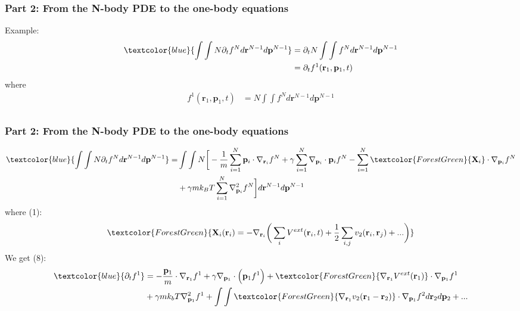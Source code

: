 \documentclass[aspectratio=169,xcolor=dvipsnames]{beamer}
\begin{document}
\begin{frame}
	\frametitle{Part 2: From the N-body PDE to the one-body equations}
	Example:
	\begin{align*}
	 \textcolor{blue}{\int \int N \partial_t f^N d \mathbf{r}^{N-1} d\mathbf{p}^{N-1}} &= \partial_t N \int \int   f^N d \mathbf{r}^{N-1} d\mathbf{p}^{N-1} \\
	 &=  \partial_t f^1(\mathbf{r}_1,\mathbf{p}_1,t)
	 \end{align*}
	 where
	 \begin{align*}
	 f^1(\mathbf{r}_1,\mathbf{p}_1,t) &=  N \int \int f^N d\mathbf{r}^{N-1} d\mathbf{p}^{N-1}\\
	\end{align*}
\end{frame}
\begin{frame}
	\frametitle{Part 2: From the N-body PDE to the one-body equations}
	\begin{align*}
	\textcolor{blue}{\int \int N \partial_t f^N d \mathbf{r}^{N-1} d\mathbf{p}^{N-1}} = &\int \int N \bigg[ - \frac{1}{m} \sum_{i=1}^N \mathbf{p}_i \cdot \nabla_{\mathbf{r}_i} f^N + \gamma \sum_{i = 1}^N \nabla_{\mathbf{p}_i}
	\cdot \mathbf{p}_i f^N 
	- \sum_{i=1}^N \textcolor{ForestGreen}{\mathbf{X}_i} \cdot \nabla_{\mathbf{p}_i}f^N \\
	&+ \gamma m k_BT \sum_{i=1}^N \nabla^2_{\mathbf{p}_i}f^N \bigg]d \mathbf{r}^{N-1} d \mathbf{p}^{N-1}	
	\end{align*}
	\vspace{-0.2cm}
	where (1):
	\begin{align*}
	\textcolor{ForestGreen}{\mathbf{X}_i(\mathbf{r}_i) = - \nabla_{\mathbf{r}_i} \bigg(\sum_i V^{ext}(\mathbf{r}_i,t) + \frac{1}{2} \sum_{i,j} v_2(\mathbf{r}_i, \mathbf{r}_j)+ ... \bigg)}
	\end{align*}
	\vspace{-0.2cm}
    We get (8):
	\begin{align*}
	\textcolor{blue}{\partial_t f^1} &=- \frac{\mathbf{p}_1}{m} \cdot \nabla_{\mathbf{r}_1}f^1 + \gamma \nabla_{\mathbf{p}_1} \cdot \left(\mathbf{p}_1 f^1\right)
    + \textcolor{ForestGreen}{\nabla_{\mathbf{r}_1}V^{ext}(\mathbf{r}_1)} \cdot \nabla_{\mathbf{p}_1}f^1 \\
    &+ \gamma mk_bT \nabla^2_{\mathbf{p}_1} f^1 + \int \int \textcolor{ForestGreen}{\nabla_{\mathbf{r}_1}v_2(\mathbf{r}_1 - \mathbf{r}_2)} \cdot \nabla_{\mathbf{p}_1}f^2 d \mathbf{r}_2 d \mathbf{p}_2 + ...
	\end{align*}

\end{frame}
\end{document}
